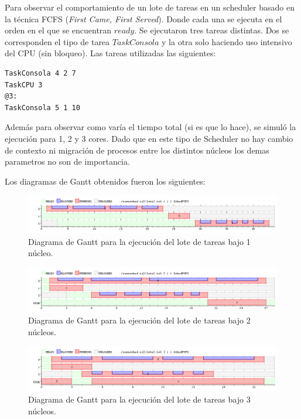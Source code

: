 \documentclass[a4paper]{article}
\begin{document}
Para observar el comportamiento de un lote de tareas en un scheduler basado en la técnica FCFS
(\textit{First Came, First Served}). Donde cada una se ejecuta en el orden en el que se encuentran $ready$. Se ejecutaron tres tareas distintas. Dos se corresponden el tipo de tarea $TaskConsola$ y la otra solo haciendo uso intensivo del CPU (sin bloqueo). Las tareas utilizadas las siguientes:
	\begin{codesnippet}
	\begin{verbatim}
TaskConsola 4 2 7
TaskCPU 3
@3:
TaskConsola 5 1 10
	\end{verbatim}
	\end{codesnippet}
	
Además para observar como varía el tiempo total (si es que lo hace), se simuló la ejecución para 1, 2 y 3 cores. Dado que en este tipo de Scheduler no hay cambio de contexto ni migración de procesos entre los distintos núcleos los demas parametros no son de importancia.

Los diagramas de Gantt obtenidos fueron los siguientes:\\

 \begin{figure}[h!]
   \begin{center}
 	\includegraphics[scale=0.5]{imagenes/ej2/1core.png}
 	\caption{Diagrama de Gantt para la ejecuci\'on del lote de tareas bajo 1 n\'ucleo.}
   \end{center}
 \end{figure} 
 

 \begin{figure}[h!]
   \begin{center}
 	\includegraphics[scale=0.5]{imagenes/ej2/2core.png}
 	\caption{Diagrama de Gantt para la ejecuci\'on del lote de tareas bajo 2 n\'ucleos.}
   \end{center}
 \end{figure} 
 
  \newpage

  \begin{figure}[h!]
   \begin{center}
 	\includegraphics[scale=0.5]{imagenes/ej2/3core.png}
 	\caption{Diagrama de Gantt para la ejecuci\'on del lote de tareas bajo 3 n\'ucleos.}
   \end{center}
 \end{figure} 
 
\end{document}
